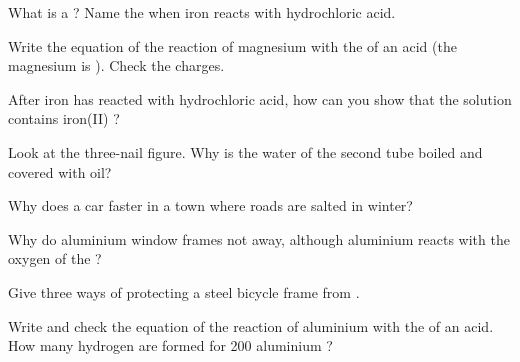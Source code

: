 \begin{exercise}[$\star$]\label{exo:g9:metals-acids-corrosion:4}
What is a ? Name the  when iron reacts with
hydrochloric acid.
\end{exercise}

\begin{exercise}[$\star\star$]\label{exo:g9:metals-acids-corrosion:5}
Write the equation of the reaction of magnesium with the   of
an acid (the magnesium  is ). Check the charges.
\end{exercise}

\begin{exercise}[$\star\star$]\label{exo:g9:metals-acids-corrosion:6}
After iron has reacted with hydrochloric acid, how can you show that the
solution contains iron(II) ?
\end{exercise}

\begin{exercise}[$\star\star$]\label{exo:g9:metals-acids-corrosion:7}
Look at the three-nail figure. Why is the water of the second tube
boiled and covered with oil?
\end{exercise}

\begin{exercise}[$\star\star$]\label{exo:g9:metals-acids-corrosion:8}
Why does a car  faster in a town where roads are salted in winter?
\end{exercise}

\begin{exercise}[$\star\star$]\label{exo:g9:metals-acids-corrosion:9}
Why do aluminium window frames not  away, although aluminium reacts
with the oxygen of the ?
\end{exercise}

\begin{exercise}[$\star\star$]\label{exo:g9:metals-acids-corrosion:10}
Give three ways of protecting a steel bicycle frame from .
\end{exercise}

\begin{exercise}[$\star\star\star$]\label{exo:g9:metals-acids-corrosion:11}
Write and check the equation of the reaction of aluminium with the
  of an acid. How many hydrogen  are formed for 200
aluminium ?
\end{exercise}

